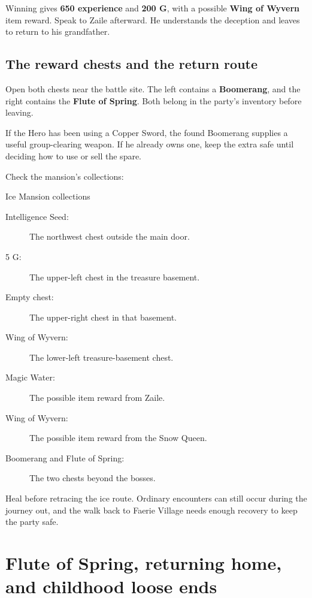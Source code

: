 Winning gives \textbf{650 experience} and \textbf{200 G}, with a
possible \textbf{Wing of Wyvern} item reward. Speak to Zaile afterward.
He understands the deception and leaves to return to his grandfather.

\subsection*{The reward chests and the return route}

Open both chests near the battle site. The left contains a
\textbf{Boomerang}, and the right contains the \textbf{Flute of Spring}.
Both belong in the party's inventory before leaving.


If the Hero has been using a Copper Sword, the found Boomerang supplies
a useful group-clearing weapon. If he already owns one, keep the extra
safe until deciding how to use or sell the spare.

Check the mansion's collections:
\begin{routecheck}{Ice Mansion collections}
\begin{description}
  \item[Intelligence Seed:] The northwest chest outside the main door.
  \item[5 G:] The upper-left chest in the treasure basement.
  \item[Empty chest:] The upper-right chest in that basement.
  \item[Wing of Wyvern:] The lower-left treasure-basement chest.
  \item[Magic Water:] The possible item reward from Zaile.
  \item[Wing of Wyvern:] The possible item reward from the Snow Queen.
  \item[Boomerang and Flute of Spring:] The two chests beyond the bosses.
\end{description}
\end{routecheck}

Heal before retracing the ice route. Ordinary encounters can still occur
during the journey out, and the walk back to Faerie Village needs enough
recovery to keep the party safe.

\section{Flute of Spring, returning home, and childhood loose ends}

